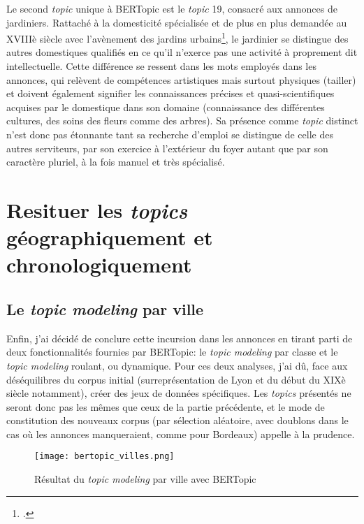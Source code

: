 Le second \textit{topic} unique à BERTopic est le \textit{topic} 19, consacré aux annonces de jardiniers. Rattaché à la domesticité spécialisée et de plus en plus demandée au XVIIIè siècle avec l'avènement des jardins urbains\footcites{synowieckiParisSesJardins2021}, le jardinier se distingue des autres domestiques qualifiés en ce qu'il n'exerce pas une activité à proprement dit intellectuelle. Cette différence se ressent dans les mots employés dans les annonces, qui relèvent de compétences artistiques mais surtout physiques (tailler) et doivent également signifier les connaissances précises et quasi-scientifiques acquises par le domestique dans son domaine (connaissance des différentes cultures, des soins des fleurs comme des arbres). Sa présence comme \textit{topic} distinct n'est donc pas étonnante tant sa recherche d'emploi se distingue de celle des autres serviteurs, par son exercice à l'extérieur du foyer autant que par son caractère pluriel, à la fois manuel et très spécialisé. 




\section{Resituer les \textit{topics} géographiquement et chronologiquement}

\subsection{Le \textit{topic modeling} par ville}

Enfin, j'ai décidé de conclure cette incursion dans les annonces en tirant parti de deux fonctionnalités fournies par BERTopic: le \textit{topic modeling} par classe et le \textit{topic modeling} roulant, ou dynamique. Pour ces deux analyses, j'ai dû, face aux déséquilibres du corpus initial (surreprésentation de Lyon et du début du XIXè siècle notamment), créer des jeux de données spécifiques. Les \textit{topics} présentés ne seront donc pas les mêmes que ceux de la partie précédente, et le mode de constitution des nouveaux corpus (par sélection aléatoire, avec doublons dans le cas où les annonces manqueraient, comme pour Bordeaux) appelle à la prudence. 

\begin{figure}[h!t]
	\centering
	\texttt{[image: bertopic\_villes.png]}
	\caption{Résultat du \textit{topic modeling} par ville avec BERTopic}
\end{figure}

